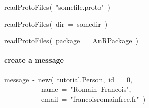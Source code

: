 \documentclass[10pt,twocolumn,a4paper]{article}
\newenvironment{Hinput}%
{}%
{}%
\newenvironment{Hchunk}%
{\vspace{0.5em}\par\begin{flushleft}}%
{\end{flushleft}}%
\newcommand{\hlstd}[1]{\textcolor[rgb]{0,0,0}{#1}}%
\newcommand{\hlnumber}[1]{\textcolor[rgb]{0.0823529411764706,0.0784313725490196,0.709803921568627}{#1}}%
\newcommand{\hlfunctioncall}[1]{\textcolor[rgb]{1,0,0}{#1}}%
\newcommand{\hlstring}[1]{\textcolor[rgb]{0.6,0.6,1}{#1}}%
\newcommand{\hlkeyword}[1]{\textcolor[rgb]{0,0,0}{#1}}%
\newcommand{\hlargument}[1]{\textcolor[rgb]{0.694117647058824,0.247058823529412,0.0196078431372549}{#1}}%
\newcommand{\hlassignement}[1]{\textcolor[rgb]{0.215686274509804,0.215686274509804,0.384313725490196}{#1}}%
\newcommand{\hlsymbol}[1]{\textcolor[rgb]{0,0,0}{#1}}%
\newcommand{\hlprompt}[1]{\textcolor[rgb]{0,0,0}{#1}}%
\begin{document}
\begin{Hchunk}
\begin{normalsize}
\begin{Hinput}

\ttfamily\noindent
\hlprompt{\usebox{\hlnormalsizeboxgreaterthan}{\ }}\hlfunctioncall{readProtoFiles}\hlkeyword{(}{\ }\hlstring{"{}somefile.proto"{}}{\ }\hlkeyword{)}\mbox{}
\normalfont

\end{Hinput}


\begin{Hinput}

\ttfamily\noindent
\hlprompt{\usebox{\hlnormalsizeboxgreaterthan}{\ }}\hlfunctioncall{readProtoFiles}\hlkeyword{(}{\ }\hlargument{dir}{\ }\hlargument{=}{\ }\hlsymbol{somedir}{\ }\hlkeyword{)}\mbox{}
\normalfont

\end{Hinput}


\begin{Hinput}

\ttfamily\noindent
\hlprompt{\usebox{\hlnormalsizeboxgreaterthan}{\ }}\hlfunctioncall{readProtoFiles}\hlkeyword{(}{\ }\hlargument{package}{\ }\hlargument{=}{\ }\hlsymbol{AnRPackage}{\ }\hlkeyword{)}\mbox{}
\normalfont

\end{Hinput}


\end{normalsize}
\end{Hchunk}


\paragraph{create a message}

\begin{Hchunk}
\begin{normalsize}
\begin{Hinput}

\ttfamily\noindent
\hlprompt{\usebox{\hlnormalsizeboxgreaterthan}{\ }}\hlsymbol{message}{\ }\hlassignement{\usebox{\hlnormalsizeboxlessthan}-}{\ }\hlfunctioncall{new}\hlkeyword{(}{\ }\hlsymbol{tutorial.Person}\hlkeyword{,}{\ }\hlargument{id}{\ }\hlargument{=}{\ }\hlnumber{0}\hlkeyword{,}\hspace*{\fill}\\
\hlstd{}\hlprompt{+{\ }}{\ }{\ }{\ }{\ }{\ }{\ }{\ }{\ }\hlargument{name}{\ }\hlargument{=}{\ }\hlstring{"{}Romain{\ }Francois"{}}\hlkeyword{,}\hspace*{\fill}\\
\hlstd{}\hlprompt{+{\ }}{\ }{\ }{\ }{\ }{\ }{\ }{\ }{\ }\hlargument{email}{\ }\hlargument{=}{\ }\hlstring{"{}francoisromain\usebox{\hlnormalsizeboxat}free.fr"{}}{\ }\hlkeyword{)}\mbox{}
\normalfont

\end{Hinput}


\end{normalsize}
\end{Hchunk}
\end{document}
